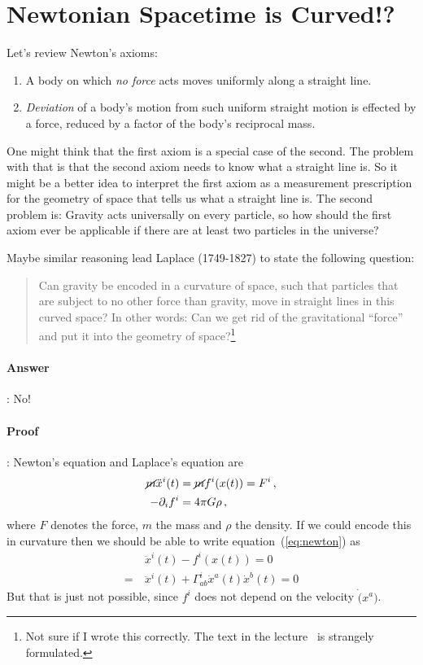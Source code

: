 \section{Newtonian Spacetime is Curved!?}
Let's review Newton's axioms:
\begin{enumerate}
    \item A body on which \textit{no force} acts moves uniformly along a straight line.
    \item \textit{Deviation} of a body's motion from such uniform straight motion is effected by a
        force, reduced by a factor of the body's reciprocal mass.
\end{enumerate}
One might think that the first axiom is a special case of the second.
The problem with that is that the second axiom needs to know what a 
straight line is.
So it might be a better idea to interpret the first axiom as a measurement prescription
for the geometry of space that tells us what a straight line is.
The second problem is: Gravity acts universally on every particle, so how should
the first axiom ever be applicable if there are at least two particles in the
universe?

Maybe similar reasoning lead Laplace (1749-1827) to state the following question:
\begin{quote}
    Can gravity be encoded in a curvature of space, such that particles that are subject
    to no other force than gravity, move in straight lines in this curved space?
    In other words: Can we get rid of the gravitational ``force'' and put it into the
    geometry of space?\footnote{%
        Not sure if I wrote this correctly. The text in the lecture~\cite{Schuller15}
    is strangely formulated.}
\end{quote}
\paragraph{Answer}: No!
\paragraph{Proof}:
Newton's equation and Laplace's equation are
\begin{align}
    \label{eq:newton} \cancel{m} \ddot{x}^i(t) &= \cancel{m} f^{i}(x(t)) = F^i\,,\\
    -\partial_i f^i &= 4\pi G \rho\,,\\
\end{align}
where $F$ denotes the force, $m$ the mass and $\rho$ the density.
If we could encode this in curvature then we should be able to write equation~(\ref{eq:newton})
as
\begin{align}
    &\ddot{x}^i(t) - f^i(x(t)) = 0\\
    =~&\ddot{x}^i(t) + \Gamma^i_{ab}\dot{x}^a(t)\dot{x}^b(t) = 0
\end{align}
But that is just not possible, since $f^i$ does not depend on the velocity $\dot(x^a)$.


